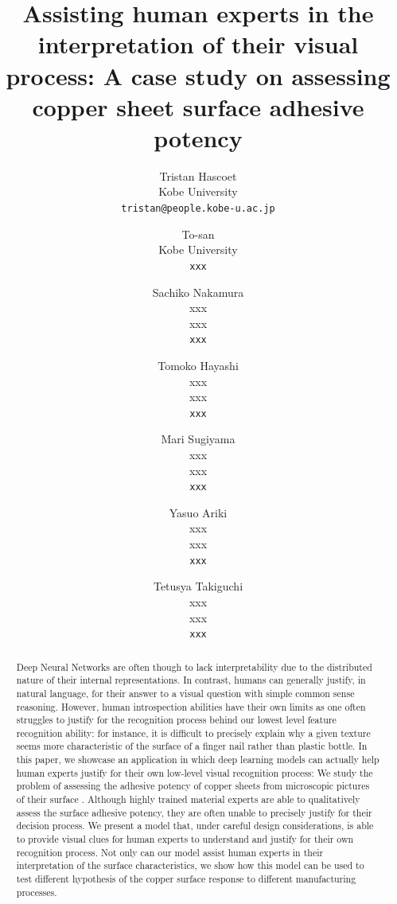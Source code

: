 \documentclass[10pt,twocolumn,letterpaper]{article}
\begin{document}
\title{Assisting human experts in the interpretation of their visual process: A case study on assessing copper sheet surface adhesive potency}%

\author{
Tristan Hascoet\\
Kobe University\\
{\tt\small tristan@people.kobe-u.ac.jp}
\and
To-san\\
Kobe University\\
{\tt\small xxx}
\and
Sachiko Nakamura\\
xxx\\
xxx\\
{\tt\small xxx}
\and
Tomoko Hayashi\\
xxx\\
xxx\\
{\tt\small xxx}
\and
Mari Sugiyama\\
xxx\\
xxx\\
{\tt\small xxx}
\and
Yasuo Ariki\\
xxx\\
xxx\\
{\tt\small xxx}
\and
Tetusya Takiguchi\\
xxx\\
xxx\\
{\tt\small xxx}
}

\maketitle


\begin{abstract}
Deep Neural Networks are often though to lack interpretability due to the distributed nature of their internal representations. In contrast, humans can generally justify, in natural language, for their answer to a visual question with simple common sense reasoning. However, human introspection abilities have their own limits as one often struggles to justify for the recognition process behind our lowest level feature recognition ability: for instance, it is difficult to precisely explain why a given texture seems more characteristic of the surface of a finger nail rather than plastic bottle.
In this paper, we showcase an application in which deep learning models can actually  help human experts justify for their own low-level visual recognition process: We study the problem of assessing the adhesive potency of copper sheets from microscopic pictures of their surface . Although highly trained material experts are able to qualitatively assess the surface adhesive potency, they are often unable to precisely justify for their decision process. We present a model that, under careful design considerations, is able to provide visual clues for human experts to understand and justify for their own recognition process. 
Not only can our model assist human experts in their interpretation of the surface characteristics, 
we show how this model can be used to test different hypothesis of the copper surface response to different manufacturing processes. 
\end{abstract}
\end{document}
